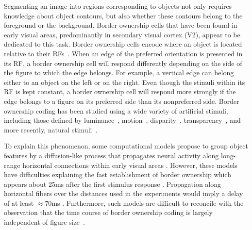 Segmenting an image into regions corresponding to objects not only requires knowledge about object contours, but also whether these contours belong to the foreground or the background. Border ownership cells that have been found in early visual areas, predominantly in secondary visual cortex (V2), appear to be dedicated to this task. Border ownership cells encode where an object is located relative to their RFs~\citep{Zhou_etal00}. 
When an edge of the preferred orientation is presented in its RF, a border ownership cell will respond differently depending on the
side of the figure to which the edge belongs. For example, a vertical edge can belong either to an object on the left or on the right. Even though the stimuli within its RF is kept constant, a border ownership cell will respond
more strongly if the edge belongs to a figure on its preferred side
than its nonpreferred side.
%
Border ownership coding has been studied using a wide variety of artificial stimuli, including those defined by luminance~\citep{Zhou_etal00}, motion~\citep{vonderHeydt_etal03a}, disparity~\citep{Qiu_vonderHeydt05}, transparency~\citep{Qiu_vonderHeydt07}, and more recently, natural stimuli~\citep{Williford_vonderHeydt14}.

To explain this phenomenon, 
%
some computational models propose to
%
 group object features by a diffusion-like process that propagates neural activity along 
long-range
%
horizontal connections
within early visual areas \citep{Grossberg94, Sajda_Finkel95, Zhaoping05}. However, these models have difficulties
explaining the fast establishment of border ownership which appears
about 25ms after the first stimulus response \citep{Zhou_etal00}.
Propagation along horizontal fibers over the distances used in the
experiments would imply a delay of at least $\approx 70$ms
\citep[][calculations based on the conduction velocity of horizontal
fibers in primate V1 cortex, we are not aware of corresponding data
for V2]{Girard_etal01}. Furthermore, such models are difficult to
reconcile with the observation that the time course of border
ownership coding is largely independent of figure
size~\citep{Sugihara_etal11}.

